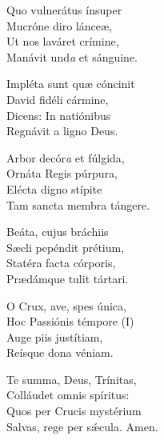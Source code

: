 Quo vulnerátus ínsuper\\
Mucróne diro lánceæ,\\
Ut nos laváret crímine,\\
Manávit und\textit{a} et sánguine.

Impléta sunt quæ cóncinit\\
David fidéli cármine,\\
Dicens: In natiónibus\\
Regnávit a ligno Deus.

Arbor decór\textit{a} et fúlgida,\\
Ornáta Regis púrpura,\\
Elé\-cta digno stípite\\
Tam san\-cta membra tángere.

Beáta, cujus bráchiis\\
Sæcli pepéndit prétium,\\
Statéra fa\-cta córporis,\\
Prædámque tulit tártari.

O Crux, ave, spes única, \\
Hoc Passiónis témpore (I) \\
Auge piis justítiam,\\
Reísque dona véniam.

Te summa, Deus, Trínitas,\\
Colláudet omnis spíritus:\\
Quos per Crucis mystérium\\
Salvas, rege per sǽcula.
Amen.

%
